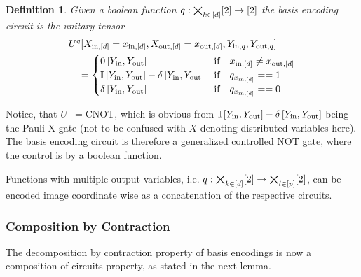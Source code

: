 \documentclass[aps,onecolumn,nofootinbib,pra]{article}
\newtheorem{definition}{Definition}
\begin{document}
    \begin{definition}
        Given a boolean function $q:\bigtimes_{k\in[d]}[2]\rightarrow[2]$ the basis encoding circuit is the unitary tensor
        \begin{align*}
            &U^{q}[X_{\mathrm{in},[d]}=x_{\mathrm{in},[d]},X_{\mathrm{out},[d]}=x_{\mathrm{out},[d]},Y_{\mathrm{in},q},Y_{\mathrm{out},q}] \\
            &\quad=
            \begin{cases}
                0\left[Y_{\mathrm{in}},Y_{\mathrm{out}}\right]
                & \text{if} \quad x_{\mathrm{in},[d]}\neq x_{\mathrm{out},[d]} \\
                \mathbb{I}\left[Y_{\mathrm{in}},Y_{\mathrm{out}}\right] - \delta\left[Y_{\mathrm{in}},Y_{\mathrm{out}}\right]
                & \text{if} \quad q_{x_{\mathrm{in},[d]}} == 1 \\
                \delta\left[Y_{\mathrm{in}},Y_{\mathrm{out}}\right]
                & \text{if} \quad q_{x_{\mathrm{in},[d]}} == 0 \\
            \end{cases}
        \end{align*}
    \end{definition}

    Notice, that $U^{\lnot} = \mathrm{CNOT}$, which is obvious from $\mathbb{I}\left[Y_{\mathrm{in}},Y_{\mathrm{out}}\right] - \delta\left[Y_{\mathrm{in}},Y_{\mathrm{out}}\right]$ being the Pauli-X gate (not to be confused with $X$ denoting distributed variables here).
    The basis encoding circuit is therefore a generalized controlled $\mathrm{NOT}$ gate, where the control is by a boolean function.

    Functions with multiple output variables, i.e. $q:\bigtimes_{k\in[d]}[2]\rightarrow\bigtimes_{l\in[p]}[2]$, can be encoded image coordinate wise as a concatenation of the respective circuits.

    \subsubsection{Composition by Contraction}

    The decomposition by contraction property of basis encodings is now a composition of circuits property, as stated in the next lemma.
\end{document}
